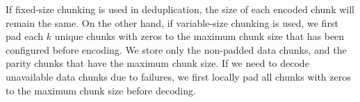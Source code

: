 If fixed-size chunking is used in deduplication, the size of each encoded chunk
will remain the same.  On the other hand, if variable-size chunking is used,
we first pad each $k$ unique chunks with zeros to the maximum chunk size that
has been configured before encoding.  We store only the non-padded data
chunks, and the parity chunks that have the maximum chunk size.  If we need to
decode unavailable data chunks due to failures, we first locally pad all
chunks with zeros to the maximum chunk size before decoding. 



%
